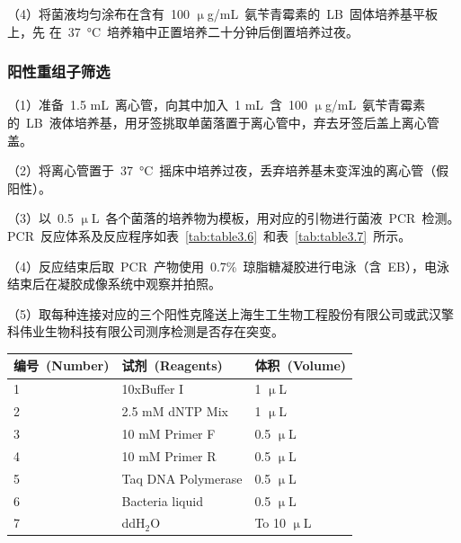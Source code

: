 （4）将菌液均匀涂布在含有\ 100 $\upmu$g/mL\ 氨苄青霉素的\ LB\ 固体培养基平板上，先
在\ \SI{37}{\degreeCelsius}\ 培养箱中正置培养二十分钟后倒置培养过夜。
\subsubsection{阳性重组子筛选}
（1）准备\ 1.5 mL\ 离心管，向其中加入\ 1 mL\ 含\ 100 $\upmu$g/mL\ 氨苄青霉素的\ LB\ 液体培养基，用牙签挑取单菌落置于离心管中，弃去牙签后盖上离心管盖。

（2）将离心管置于\ \SI{37}{\degreeCelsius}\ 摇床中培养过夜，丢弃培养基未变浑浊的离心管（假阳性）。

（3）以\ 0.5 $\upmu$L\ 各个菌落的培养物为模板，用对应的引物进行菌液\ PCR\ 检测。PCR\ 反应体系及反应程序如表\ \ref{tab:table3.6}\ 和表\ \ref{tab:table3.7}\ 所示。

（4）反应结束后取\ PCR\ 产物使用\ 0.7\%\ 琼脂糖凝胶进行电泳（含\ EB），电泳结束后在凝胶成像系统中观察并拍照。

（5）取每种连接对应的三个阳性克隆送上海生工生物工程股份有限公司或武汉擎科伟业生物科技有限公司测序检测是否存在突变。

\begin{table}[!ht]
\centering
{
\par}
\small
\begin{tabular*}{\textwidth}[c]{@{\extracolsep{\fill}}lll}
\toprule
编号\ (Number) & 试剂\ (Reagents) & 体积\ (Volume)\\
\midrule
1 & 10xBuffer I & 1 $\upmu$L\\
2 & 2.5 mM dNTP Mix & 1 $\upmu$L\\
3 & 10 mM Primer F & 0.5 $\upmu$L\\
4 & 10 mM Primer R & 0.5 $\upmu$L\\
5 & Taq DNA Polymerase & 0.5 $\upmu$L\\
6 & Bacteria liquid & 0.5 $\upmu$L\\
7 & ddH$_2$O & To 10 $\upmu$L\\
\bottomrule
\end{tabular*}
\end{table}

